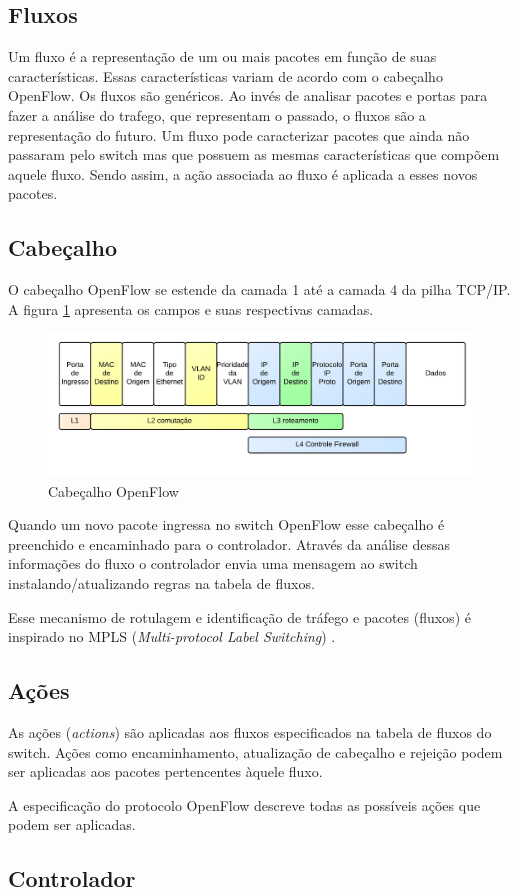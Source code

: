 \subsection{Fluxos}

Um fluxo é a representação de um ou mais pacotes em função de suas
características.
Essas características variam de acordo com o cabeçalho OpenFlow.
Os fluxos são genéricos. 
Ao invés de analisar pacotes e portas para fazer a análise do trafego,
que representam o passado, o fluxos são a representação do futuro. 
Um fluxo pode caracterizar pacotes que ainda não passaram pelo switch mas 
que possuem as mesmas características que compõem aquele fluxo. 
Sendo assim, a ação associada ao fluxo é aplicada a esses novos pacotes.

\subsection{Cabeçalho}

O cabeçalho OpenFlow se estende da camada 1 até a camada 4 da pilha TCP/IP.
A figura \ref{fig:of-header} apresenta os campos e suas respectivas camadas.

\begin{figure}[h!]
    \centering
    \label{fig:of-header}
    \includegraphics[width=\linewidth]{img/openflow-header}
    \caption{Cabeçalho OpenFlow}
\end{figure}

Quando um novo pacote ingressa no switch OpenFlow esse cabeçalho é preenchido
e encaminhado para o controlador. 
Através da análise dessas informações do fluxo o controlador envia uma 
mensagem ao switch instalando/atualizando regras na tabela de fluxos. 

Esse mecanismo de rotulagem e identificação de tráfego e pacotes (fluxos) é
inspirado no MPLS (\emph{Multi-protocol Label Switching}) 
\citep{bruce2008mpls}.

\subsection{Ações}

As ações (\emph{actions}) são aplicadas aos fluxos especificados na tabela
de fluxos do switch.
Ações como encaminhamento, atualização de cabeçalho e rejeição podem ser 
aplicadas aos pacotes pertencentes àquele fluxo.

A especificação do protocolo OpenFlow \citep{ofprotocol2015} descreve todas 
as possíveis ações que podem ser aplicadas.

\subsection{Controlador}
